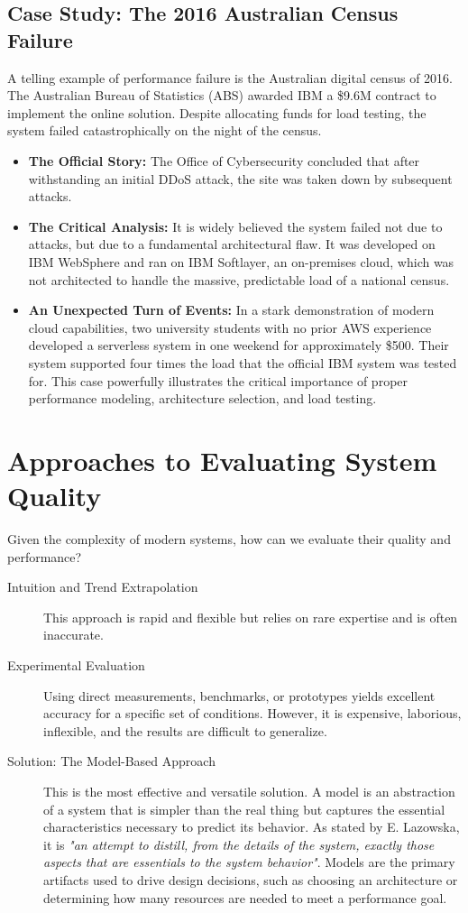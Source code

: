\subsection{Case Study: The 2016 Australian Census Failure}
A telling example of performance failure is the Australian digital census of 2016. The Australian Bureau of Statistics (ABS) awarded IBM a \$9.6M contract to implement the online solution. Despite allocating funds for load testing, the system failed catastrophically on the night of the census.
\begin{itemize}
    \item \textbf{The Official Story:} The Office of Cybersecurity concluded that after withstanding an initial DDoS attack, the site was taken down by subsequent attacks.
    \item \textbf{The Critical Analysis:} It is widely believed the system failed not due to attacks, but due to a fundamental architectural flaw. It was developed on IBM WebSphere and ran on IBM Softlayer, an on-premises cloud, which was not architected to handle the massive, predictable load of a national census.
    \item \textbf{An Unexpected Turn of Events:} In a stark demonstration of modern cloud capabilities, two university students with no prior AWS experience developed a serverless system in one weekend for approximately \$500. Their system supported four times the load that the official IBM system was tested for. This case powerfully illustrates the critical importance of proper performance modeling, architecture selection, and load testing.
\end{itemize}

\section{Approaches to Evaluating System Quality}
Given the complexity of modern systems, how can we evaluate their quality and performance?
\begin{description}
    \item[Intuition and Trend Extrapolation] This approach is rapid and flexible but relies on rare expertise and is often inaccurate.
    \item[Experimental Evaluation] Using direct measurements, benchmarks, or prototypes yields excellent accuracy for a specific set of conditions. However, it is expensive, laborious, inflexible, and the results are difficult to generalize.
    \item[Solution: The Model-Based Approach] This is the most effective and versatile solution. A model is an abstraction of a system that is simpler than the real thing but captures the essential characteristics necessary to predict its behavior. As stated by E. Lazowska, it is \textit{"an attempt to distill, from the details of the system, exactly those aspects that are essentials to the system behavior"}. Models are the primary artifacts used to drive design decisions, such as choosing an architecture or determining how many resources are needed to meet a performance goal.
\end{description}

